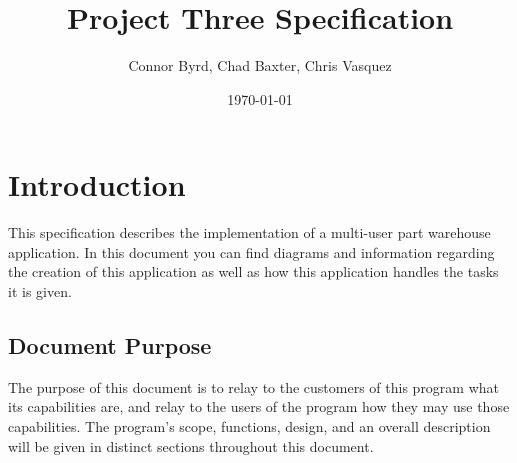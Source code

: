 \documentclass{report}
\begin{document}
\title{Project Three Specification}
\author{Connor Byrd, Chad Baxter, Chris Vasquez}
\date{\today}
\maketitle

\tableofcontents

\renewcommand\thesection{\arabic{section}}
\renewcommand\thesubsection{\thesection.\arabic{subsection}}
\renewcommand\thesubsubsection{\thesubsection.\arabic{subsubsection}}

\clearpage
\section{Introduction}
\label{sec:intro}
This specification describes the implementation of a multi-user part warehouse application. In this document you can find diagrams and information regarding the creation of this application as well as how this application handles the tasks it is given. \par
\subsection{Document Purpose}
\label{sec:purpose}
The purpose of this document is to relay to the customers of this program what its capabilities are, and relay to the users of the program how they may use those capabilities. The program’s scope, functions, design, and an overall description will be given in distinct sections throughout this document.\par
\end{document}
